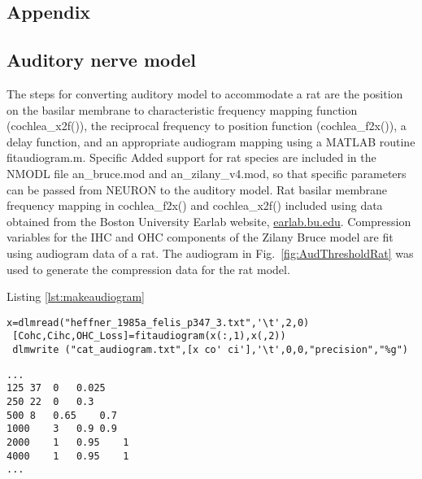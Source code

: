 \graphicspath{{/media/data/Work/cnstellate/}{/media/data/Work/cnstellate/Responses/}{../figures/}{./gfx/}}

\renewcommand{\setthesubsection}{\Alph{subsection}}
\begin{appendix}
\section{Appendix}
\label{sec:chp3appendix}

\subsection{Auditory nerve model}

The steps for converting \citet{ZilanyBruce:2007} auditory model to
accommodate a rat are the position on the basilar membrane to
characteristic frequency mapping function (\mbox{\textsf{cochlea\_x2f()}}), the
reciprocal frequency to position function (\mbox{\textsf{cochlea\_f2x()}}), a
delay function, and an appropriate audiogram mapping using a MATLAB
routine \mbox{\textsf{fitaudiogram.m}}.  Specific Added support for rat species
are included in the NMODL file \mbox{\textsf{an\_bruce.mod}} and \mbox{\textsf{an\_zilany\_v4.mod}}, so that specific
parameters can be passed from NEURON to the auditory model.  Rat
basilar membrane frequency mapping in \mbox{\textsf{cochlea\_f2x()}} and
\mbox{\textsf{cochlea\_x2f()}} included using data obtained from the Boston University Earlab
website, \url{earlab.bu.edu}.  Compression variables for the IHC and OHC
components of the Zilany Bruce model are fit using audiogram data of a
rat.  The audiogram in Fig.~\ref{fig:AudThresholdRat} was used to
generate the compression data for the rat model.

\medskip{}

Listing \ref{lst:makeaudiogram}
\begin{lstlisting}[label=lst:makeaudiogram,caption=Using fitaudiogram.m to create COHC and CIHC vectors for the cat.]
 x=dlmread("heffner_1985a_felis_p347_3.txt",'\t',2,0)
 [Cohc,Cihc,OHC_Loss]=fitaudiogram(x(:,1),x(,2))
 dlmwrite ("cat_audiogram.txt",[x co' ci'],'\t',0,0,"precision","%g")
\end{lstlisting}


\begin{lstlisting}[label=lst:cataudiogram,caption=Portion of cat\_audiogram.txt]
...
125	37	0	0.025
250	22	0	0.3
500	8	0.65	0.7
1000	3	0.9	0.9
2000	1	0.95	1
4000	1	0.95	1
...
\end{lstlisting}



\end{appendix}
